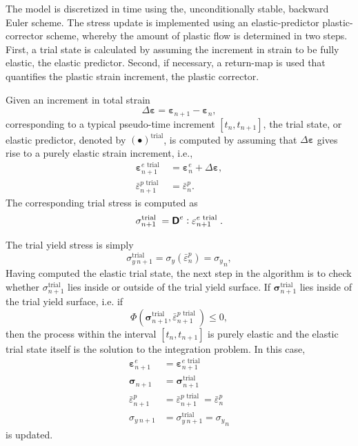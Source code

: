 The model is discretized in time using the, unconditionally stable, backward Euler scheme.
The stress update is implemented using an elastic-predictor plastic-corrector scheme, whereby the amount of plastic flow is determined in two steps.
First, a trial state is calculated by assuming the increment in strain to be fully elastic, the elastic predictor.
Second, if necessary, a return-map is used that quantifies the plastic strain increment, the plastic corrector.

Given an increment in total strain
\begin{equation}
\Delta \bm \varepsilon=\bm\varepsilon_{n+1}-\bm \varepsilon_n,
\end{equation}
corresponding to a typical pseudo-time increment \([t_n, t_{n+1}]\), the trial state, or elastic predictor, denoted by \((\bullet)^\text{trial}\), is computed by assuming that \(\Delta \bm \varepsilon\) gives rise to a purely elastic strain increment, i.e.,
\begin{align}
\bm \varepsilon_{n+1}^{e \text { trial }}&=\bm \varepsilon_{n}^{e}+\Delta \bm \varepsilon, \\
\bar{\varepsilon}_{n+1}^{p \text { trial }}&=\bar{\varepsilon}_{n}^{p}.
\end{align}
The corresponding trial stress is computed as
\begin{equation}
\sigma_{n+1}^{\text {trial }}=\boldsymbol{\mathsf{D}}^{e}: \varepsilon_{n+1}^{e \text { trial }}.
\end{equation}

The trial yield stress is simply
\begin{equation}
\sigma_{y\:n+1}^{\text {trial }}=\sigma_{y}\left(\bar{\varepsilon}_{n}^{p}\right)={\sigma_{y}}_n,
\end{equation}
Having computed the elastic trial state, the next step in the algorithm is to check whether \(\sigma_{n+1}^{\text {trial }}\) lies inside or outside of the trial yield surface.
If \(\bm \sigma_{n+1}^{\text {trial }}\) lies inside of the trial yield surface, i.e. if
\begin{equation}
\Phi\left(\bm \sigma_{n+1}^{\text {trial }},\bar{\varepsilon}_{n+1}^{p \text { trial }} \right) \leq 0,
\end{equation}
then the process within the interval \(\left[t_{n}, t_{n+1}\right]\) is purely elastic and the elastic trial state itself is the solution to the integration problem. In this case,
\begin{align}
\bm\varepsilon_{n+1}^{e}&=\bm\varepsilon_{n+1}^{e \text { trial }} \\
\bm\sigma_{n+1}&=\bm\sigma_{n+1}^{\text {trial }} \\
\bar{\varepsilon}_{n+1}^{p}&=\bar{\varepsilon}_{n+1}^{p \text { trial }}=\bar{\varepsilon}_{n}^{p} \\
\sigma_{y\:n+1}&=\sigma_{y\:n+1}^{\text {trial }}={\sigma_{y}}_n
\end{align}
is updated.

